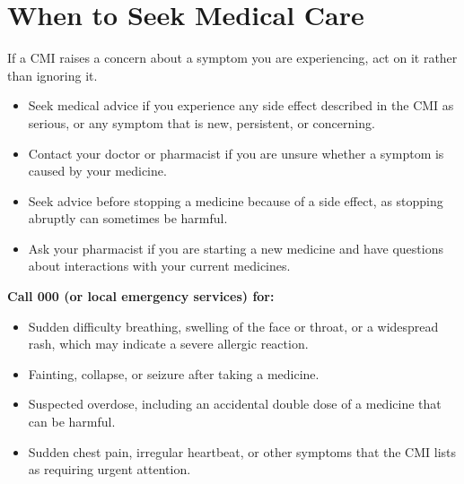 \section*{When to Seek Medical Care}
If a CMI raises a concern about a symptom you are experiencing, act on it rather than ignoring it.
\begin{itemize}
    \item Seek medical advice if you experience any side effect described in the CMI as serious, or any symptom that is new, persistent, or concerning.
    \item Contact your doctor or pharmacist if you are unsure whether a symptom is caused by your medicine.
    \item Seek advice before stopping a medicine because of a side effect, as stopping abruptly can sometimes be harmful.
    \item Ask your pharmacist if you are starting a new medicine and have questions about interactions with your current medicines.
\end{itemize}

\textbf{Call 000 (or local emergency services) for:}
\begin{itemize}
    \item Sudden difficulty breathing, swelling of the face or throat, or a widespread rash, which may indicate a severe allergic reaction.
    \item Fainting, collapse, or seizure after taking a medicine.
    \item Suspected overdose, including an accidental double dose of a medicine that can be harmful.
    \item Sudden chest pain, irregular heartbeat, or other symptoms that the CMI lists as requiring urgent attention.
\end{itemize}

